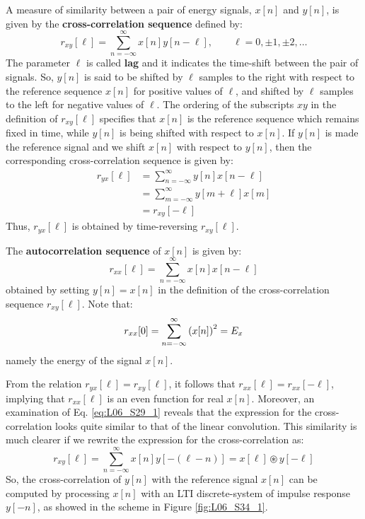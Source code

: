 \documentclass[../../main/main.tex]{subfiles}
\begin{document}
\medskip
{}
A measure of similarity between a pair of energy signals, \( x[n] \) and \( y[n] \), is given by the \textbf{cross-correlation sequence} defined by:
\begin{equation}
    r_{xy}[\ell]
    =
    \sum_{n=-\infty}^{\infty} x[n]y[n-\ell],
    \qquad
    \ell = 0, \pm 1, \pm 2, \dots
    \label{eq:L06_S29_1}
\end{equation}
The parameter \( \ell \) is called \textbf{lag} and it indicates the time-shift between the pair of signals. So, \( y[n] \) is said to be shifted by \( \ell \) samples to the right with respect to the reference sequence \( x[n] \) for positive values of \( \ell \), and shifted by \( \ell \) samples to the left for negative values of \( \ell \).
The ordering of the subscripts \( xy \) in the definition of \( r_{xy}[\ell] \) specifies that \( x[n] \) is the reference sequence which remains fixed in time, while \( y[n] \) is being shifted with respect to \( x[n] \).
If \( y[n] \) is made the reference signal and we shift \( x[n] \) with respect to \( y[n] \), then the corresponding cross-correlation sequence is given by:
\begin{align}
    r_{yx}[\ell]
    &=
        \sum_{n=-\infty}^{\infty} y[n]x[n-\ell] \nonumber   \\
    &=
        \sum_{m=-\infty}^{\infty} y[m+\ell] x[m]    \nonumber   \\
    &=
        r_{xy}[-\ell]
\end{align}
Thus, \( r_{yx}[\ell] \) is obtained by time-reversing \( r_{xy}[\ell] \).


\medskip
{}
The \textbf{autocorrelation sequence} of \( x[n] \) is given by:
\begin{equation}
    r_{xx}[\ell]
    =
    \sum_{n=-\infty}^{\infty} x[n]x[n-\ell]
    \label{eq:L06_S32_1}
\end{equation}
obtained by setting \( y[n] = x[n] \) in the definition of the cross-correlation sequence \( r_{xy}[\ell] \). Note that:
\begin{equation}
    r_{xx}[0]
    =
    \sum_{n=-\infty}^{\infty} \qty(x[n])^{2}
    =
    E_{x}
    \label{eq:L06_S32_2}
\end{equation}
namely the energy of the signal \( x[n] \).

From the relation \( r_{yx}[\ell] = r_{xy}[\ell] \), it follows that \( r_{xx}[\ell] = r_{xx}[-\ell] \), implying that \( r_{xx}[\ell] \) is an even function for real \( x[n] \). Moreover, an examination of Eq. \ref{eq:L06_S29_1} reveals that the expression for the cross-correlation looks quite similar to that of the linear convolution. This similarity is much clearer if we rewrite the expression for the cross-correlation as:
\begin{equation}
    r_{xy}[\ell]
    =
    \sum_{n=-\infty}^{\infty} x[n]y[-(\ell - n)]
    =
    x[\ell] \circledast y[-\ell]
    \label{eq:L06_S34_1}
\end{equation}
So, the cross-correlation of \( y[n] \) with the reference signal \( x[n] \) can be computed by processing \( x[n] \) with an LTI discrete-system of impulse response \( y[-n] \), as showed in the scheme in Figure \ref{fig:L06_S34_1}.
\end{document}
